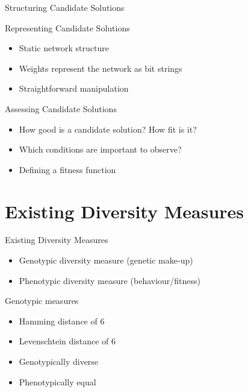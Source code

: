 
\begin{frame}{Structuring Candidate Solutions}
  \begin{center}
    
  \end{center}
\end{frame}

\begin{frame}{Representing Candidate Solutions}
  \begin{itemize}
    \item Static network structure
    \item Weights represent the network as bit strings
    \item Straightforward manipulation
  \end{itemize}
\end{frame}

\begin{frame}{Assessing Candidate Solutions}
  \begin{itemize}
    \item How good is a candidate solution? How fit is it?
    \item Which conditions are important to observe?
    \item Defining a fitness function
  \end{itemize}
\end{frame}

\section{Existing Diversity Measures}

\begin{frame}{Existing Diversity Measures}
  \begin{itemize}
    \item Genotypic diversity measure (genetic make-up)
    \item Phenotypic diversity measure (behaviour/fitness)
  \end{itemize}
\end{frame}

\begin{frame}{Genotypic measures}
  

  \begin{itemize}
    \item Hamming distance of 6
    \item Levenschtein distance of 6
    \item Genotypically diverse
    \item Phenotypically equal
  \end{itemize}
\end{frame}

